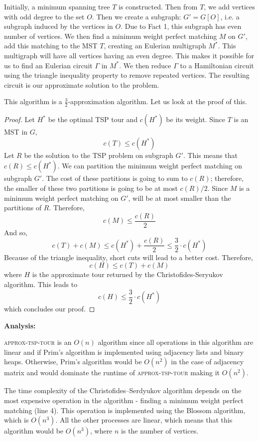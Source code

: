 \documentclass[12pt]{report}
\begin{document}
\par
  Initially, a minimum spanning tree $T$ is constructed. Then from $T$, we add vertices with odd degree to the set $O$. 
  Then we create a subgraph: $G' = G[O]$, i.e. a subgraph induced by the vertices in $O$. Due to Fact 1, this subgraph has 
  even number of vertices. We then find a minimum weight perfect matching $M$ on $G'$, add this matching to the MST $T$, creating 
  an Eulerian multigraph $M^*$. This multigraph will have all vertices having an even degree. This makes it possible for us 
  to find an Eulerian circuit $\Gamma$ in $M^*$. We then reduce $\Gamma$ to a Hamiltonian circuit using the triangle inequality 
  property to remove repeated vertices. The resulting circuit is our approximate solution to the problem. 
  \par
  This algorithm is a $\frac{3}{2}$-approximation algorithm. Let us look at the proof of this. 
  
  \begin{proof}
  

  \par
    Let $H^*$ be the optimal TSP tour and $c(H^*)$ be its weight. 
    Since $T$ is an MST in $G$, \[c(T) \leq c(H^*)\] 
    Let $R$ be the solution to the TSP problem on subgraph $G'$. This means that $c(R) \leq c(H^*)$. We can partition the minimum weight perfect matching 
    on subgraph $G'$. The cost of these partitions is going to sum to $c(R)$; therefore, the smaller of these two partitions is 
    going to be at most $c(R)/2$. Since $M$ is a minimum weight perfect matching on $G'$, will be at most smaller than the partitions of $R$. 
    Therefore, \[c(M) \leq \frac{c(R)}{2}\]
    And so, \[c(T) + c(M) \leq c(H^*) + \frac{c(R)}{2} \leq \frac{3}{2} \cdot c(H^*)\]
    Because of the triangle inequality, short cuts will lead to a better cost. Therefore, 
    \[c(H) \leq c(T) + c(M) \] where $H$ is the approximate tour returned by the Christofides-Seryukov algorithm. This leads to
    \[c(H) \leq \frac{3}{2} \cdot c(H^*)\]
    which concludes our proof.
      \end{proof}

  \textbf{Analysis:} \par
  \textsc{approx-tsp-tour} is an $O(n)$ algorithm since all operations in this algorithm are linear and if Prim's algorithm is 
  implemented using adjacency lists and binary heaps. Otherwise, Prim's algorithm would be $O(n^2)$ in the 
  case of adjacency matrix and would dominate the runtime of \textsc{approx-tsp-tour} making it $O(n^2)$.
  \par The time complexity of the Christofides–Serdyukov algorithm depends on the most expensive operation in the 
  algorithm - finding a minimum weight perfect matching (line 4). This operation is implemented using the Blossom algorithm, which is $O(n^3)$. All the other 
  processes are linear, which means that this algorithm would be $O(n^3)$, where $n$ is the number of vertices. 
\end{document}
